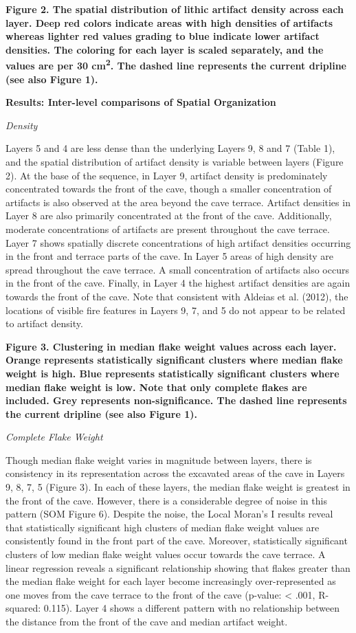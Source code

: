 \documentclass[smallextended]{svjour3}       %
\begin{document}
\textbf{Figure 2. The spatial distribution of lithic artifact density
across each layer. Deep red colors indicate areas with high densities of
artifacts whereas lighter red values grading to blue indicate lower
artifact densities. The coloring for each layer is scaled separately,
and the values are per 30 cm\textsuperscript{2}. The dashed line
represents the current dripline (see also Figure 1).}

\textbf{Results: Inter-level comparisons of Spatial Organization}

\emph{Density}

Layers 5 and 4 are less dense than the underlying Layers 9, 8 and 7
(Table 1), and the spatial distribution of artifact density is variable
between layers (Figure 2). At the base of the sequence, in Layer 9,
artifact density is predominately concentrated towards the front of the
cave, though a smaller concentration of artifacts is also observed at
the area beyond the cave terrace. Artifact densities in Layer 8 are also
primarily concentrated at the front of the cave. Additionally, moderate
concentrations of artifacts are present throughout the cave terrace.
Layer 7 shows spatially discrete concentrations of high artifact
densities occurring in the front and terrace parts of the cave. In Layer
5 areas of high density are spread throughout the cave terrace. A small
concentration of artifacts also occurs in the front of the cave.
Finally, in Layer 4 the highest artifact densities are again towards the
front of the cave. Note that consistent with Aldeias et al. (2012), the
locations of visible fire features in Layers 9, 7, and 5 do not appear
to be related to artifact density.

\textbf{Figure 3. Clustering in median flake weight values across each
layer. Orange represents statistically significant clusters where median
flake weight is high. Blue represents statistically significant clusters
where median flake weight is low. Note that only complete flakes are
included. Grey represents non-significance. The dashed line represents
the current dripline (see also Figure 1).}

\emph{Complete Flake Weight}

Though median flake weight varies in magnitude between layers, there is
consistency in its representation across the excavated areas of the cave
in Layers 9, 8, 7, 5 (Figure 3). In each of these layers, the median
flake weight is greatest in the front of the cave. However, there is a
considerable degree of noise in this pattern (SOM Figure 6). Despite the
noise, the Local Moran's I results reveal that statistically significant
high clusters of median flake weight values are consistently found in
the front part of the cave. Moreover, statistically significant clusters
of low median flake weight values occur towards the cave terrace. A
linear regression reveals a significant relationship showing that flakes
greater than the median flake weight for each layer become increasingly
over-represented as one moves from the cave terrace to the front of the
cave (p-value: \textless{} .001, R-squared: 0.115). Layer 4 shows a
different pattern with no relationship between the distance from the
front of the cave and median artifact weight.
\end{document}
